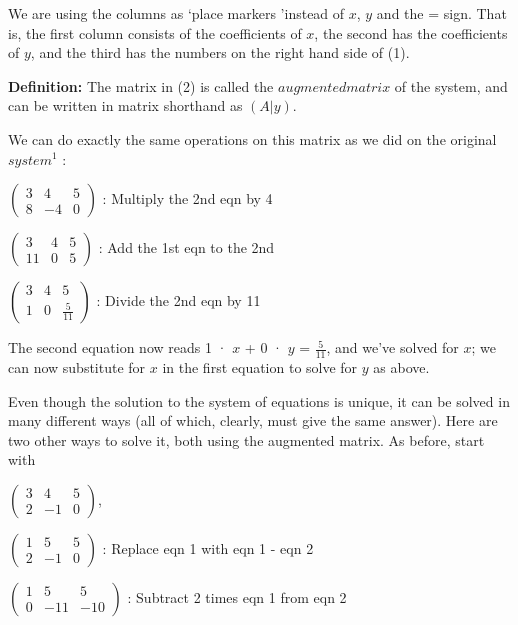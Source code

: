\documentclass{book}
\begin{document}
We are using the columns as \lq place markers \rq instead of $x$, $y$ and the = sign. That is, the first column consists of the coefficients of $x$, the second has the coefficients of $y$, and the third has the numbers on the right hand side of (1).

\textbf{Definition:} The matrix in (2) is called the $augmented matrix$ of the system, and can be written in matrix shorthand as $(A|y)$.

We can do exactly the same operations on this matrix as we did on the original $system^1$ :

\hspace{1cm} $\begin{pmatrix} 3 & 4 & 5 \\ 8 & -4 & 0\end{pmatrix}$ : Multiply the 2nd eqn by 4

	\hspace{1cm}$ \begin{pmatrix} 3 & 4 & 5 \\ 11 & 0 & 5\end{pmatrix} $ : Add the 1st eqn to the 2nd

		\hspace{1cm} $\begin{pmatrix} 3 & 4 & 5 \\ 1 & 0 & \frac{5}{11} \end{pmatrix}$ : Divide the 2nd eqn by 11

			The second equation now reads 1 · $x$ + 0 · $y$ = $\frac{5}{11}$, and we\rq ve solved for $x$; we can now substitute for $x$ in the first equation to solve for $y$ as above.

Even though the solution to the system of equations is unique, it can be solved in many different ways (all of which, clearly, must give the same answer). Here are two other ways to solve it, both using the augmented matrix. As before, start with


\hspace{1cm} $\begin{pmatrix} 3 & 4 & 5 \\ 2 & -1 & 0 \end{pmatrix}$,

	\hspace{1cm}	$\begin{pmatrix} 1 & 5 & 5 \\ 2 & -1 & 0 \end{pmatrix}$ : Replace eqn 1 with eqn 1 - eqn 2 

		\hspace{1cm} $\begin{pmatrix} 1 & 5 & 5 \\ 0 & -11 & -10 \end{pmatrix}$ : Subtract 2 times eqn 1 from eqn 2 
\end{document}
